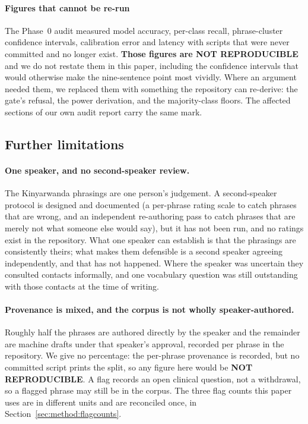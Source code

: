 \paragraph{Figures that cannot be re-run}

The Phase~0 audit measured model accuracy, per-class recall, phrase-cluster
confidence intervals, calibration error and latency with scripts that were never
committed and no longer exist. \textbf{Those figures are NOT REPRODUCIBLE} and we
do not restate them in this paper, including the confidence intervals that would
otherwise make the nine-sentence point most vividly. Where an argument needed
them, we replaced them with something the repository can re-derive: the gate's
refusal, the power derivation, and the majority-class floors. The affected
sections of our own audit report carry the same mark.

\subsection{Further limitations}

\paragraph{One speaker, and no second-speaker review.} The Kinyarwanda
phrasings are one person's judgement. A second-speaker protocol is designed and
documented (a per-phrase rating scale to catch phrases that are wrong, and an
independent re-authoring pass to catch phrases that are merely not what someone
else would say), but it has not been run, and no ratings exist in the
repository. What one speaker can establish is that the phrasings are
consistently theirs; what makes them defensible is a second speaker agreeing
independently, and that has not happened. Where the speaker was uncertain they
consulted contacts informally, and one vocabulary question was still outstanding
with those contacts at the time of writing.

\paragraph{Provenance is mixed, and the corpus is not wholly speaker-authored.}
Roughly half the phrases are authored directly by the speaker and the remainder
are machine drafts under that speaker's approval, recorded per phrase in the
repository. We give no percentage: the per-phrase provenance is recorded, but no
committed script prints the split, so any figure here would be \textbf{NOT
REPRODUCIBLE}. A flag records an open clinical question, not a withdrawal, so a flagged phrase
may still be in the corpus. The three flag counts this paper uses are in
different units and are reconciled once, in
Section~\ref{sec:method:flagcounts}.

